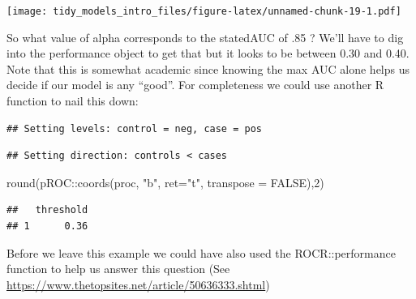 \documentclass[
]{article}
\newenvironment{Shaded}{\begin{snugshade}}{\end{snugshade}}
\newcommand{\AttributeTok}[1]{\textcolor[rgb]{0.77,0.63,0.00}{#1}}
\newcommand{\ConstantTok}[1]{\textcolor[rgb]{0.00,0.00,0.00}{#1}}
\newcommand{\DecValTok}[1]{\textcolor[rgb]{0.00,0.00,0.81}{#1}}
\newcommand{\FunctionTok}[1]{\textcolor[rgb]{0.00,0.00,0.00}{#1}}
\newcommand{\NormalTok}[1]{#1}
\newcommand{\OtherTok}[1]{\textcolor[rgb]{0.56,0.35,0.01}{#1}}
\newcommand{\SpecialCharTok}[1]{\textcolor[rgb]{0.00,0.00,0.00}{#1}}
\newcommand{\StringTok}[1]{\textcolor[rgb]{0.31,0.60,0.02}{#1}}
\begin{document}
\texttt{[image: tidy\_models\_intro\_files/figure-latex/unnamed-chunk-19-1.pdf]}

So what value of alpha corresponds to the statedAUC of .85 ? We'll have
to dig into the performance object to get that but it looks to be
between 0.30 and 0.40. Note that this is somewhat academic since knowing
the max AUC alone helps us decide if our model is any ``good''. For
completeness we could use another R function to nail this down:

\begin{Shaded}
\end{Shaded}

\begin{verbatim}
## Setting levels: control = neg, case = pos
\end{verbatim}

\begin{verbatim}
## Setting direction: controls < cases
\end{verbatim}

\begin{Shaded}
\begin{Highlighting}[]
\FunctionTok{round}\NormalTok{(pROC}\SpecialCharTok{::}\FunctionTok{coords}\NormalTok{(proc, }\StringTok{"b"}\NormalTok{, }\AttributeTok{ret=}\StringTok{"t"}\NormalTok{, }\AttributeTok{transpose =} \ConstantTok{FALSE}\NormalTok{),}\DecValTok{2}\NormalTok{)}
\end{Highlighting}
\end{Shaded}

\begin{verbatim}
##   threshold
## 1      0.36
\end{verbatim}

Before we leave this example we could have also used the
ROCR::performance function to help us answer this question (See
\url{https://www.thetopsites.net/article/50636333.shtml})
\end{document}
